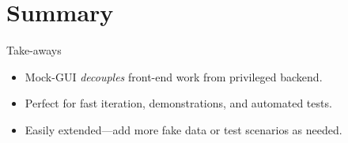 \documentclass[
  ngerman,          %
  authorontitle=true,
]{bfhbeamer}
\begin{document}
\section{Summary}

\begin{frame}{Take-aways}
  \begin{itemize}
    \item Mock-GUI \emph{decouples} front-end work from privileged backend.
    \item Perfect for fast iteration, demonstrations, and automated tests.
    \item Easily extended—add more fake data or test scenarios as needed.
  \end{itemize}
\end{frame}
\end{document}
